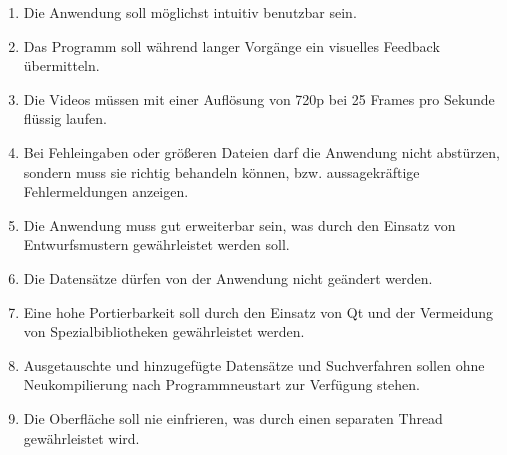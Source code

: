 \begin{enumerate} [label=\bfseries /NF \arabic*0/, leftmargin=*]
  \item Die Anwendung soll möglichst intuitiv benutzbar sein.
  \item Das Programm soll während langer Vorgänge ein visuelles Feedback übermitteln.
  \item Die Videos müssen mit einer Auflösung  von 720p bei 25 Frames pro Sekunde flüssig laufen.
  \item Bei Fehleingaben oder größeren Dateien darf die Anwendung nicht abstürzen, sondern muss sie richtig behandeln können, bzw. aussagekräftige Fehlermeldungen anzeigen.
  \item Die Anwendung muss gut erweiterbar sein, was durch den Einsatz von Entwurfsmustern gewährleistet werden soll.
  \item Die Datensätze dürfen von der Anwendung nicht geändert werden.
  \item Eine hohe Portierbarkeit soll durch den Einsatz von \gls{Qt} und der Vermeidung von Spezialbibliotheken gewährleistet werden.
  \item Ausgetauschte und hinzugefügte Datensätze und Suchverfahren sollen ohne Neukompilierung nach Programmneustart zur Verfügung stehen.
  \item Die Oberfläche soll nie einfrieren, was durch einen separaten Thread gewährleistet wird.
\end{enumerate}
\pagebreak
